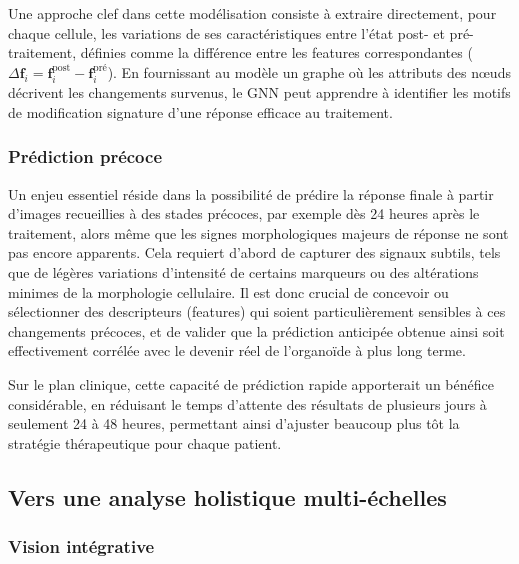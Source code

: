 Une approche clef dans cette modélisation consiste à extraire directement, pour chaque cellule, les variations de ses caractéristiques entre l’état post- et pré-traitement, définies comme la différence entre les features correspondantes (\(\Delta \mathbf{f}_i = \mathbf{f}_i^{\text{post}} - \mathbf{f}_i^{\text{pré}}\)). En fournissant au modèle un graphe où les attributs des nœuds décrivent les changements survenus, le GNN peut apprendre à identifier les motifs de modification signature d’une réponse efficace au traitement.

\subsubsection{Prédiction précoce}

Un enjeu essentiel réside dans la possibilité de prédire la réponse finale à partir d’images recueillies à des stades précoces, par exemple dès 24 heures après le traitement, alors même que les signes morphologiques majeurs de réponse ne sont pas encore apparents. Cela requiert d’abord de capturer des signaux subtils, tels que de légères variations d’intensité de certains marqueurs ou des altérations minimes de la morphologie cellulaire. Il est donc crucial de concevoir ou sélectionner des descripteurs (features) qui soient particulièrement sensibles à ces changements précoces, et de valider que la prédiction anticipée obtenue ainsi soit effectivement corrélée avec le devenir réel de l’organoïde à plus long terme.

Sur le plan clinique, cette capacité de prédiction rapide apporterait un bénéfice considérable, en réduisant le temps d’attente des résultats de plusieurs jours à seulement 24 à 48 heures, permettant ainsi d’ajuster beaucoup plus tôt la stratégie thérapeutique pour chaque patient.


\subsection{Vers une analyse holistique multi-échelles}

\subsubsection{Vision intégrative}


